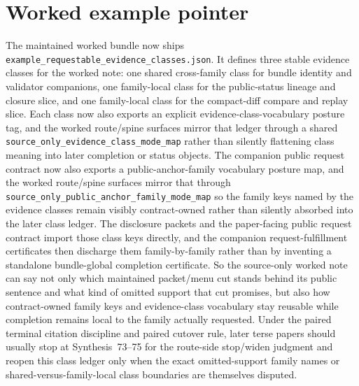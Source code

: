 \documentclass[11pt]{article}
\begin{document}
\section{Worked example pointer}
The maintained worked bundle now ships \nolinkurl{example_requestable_evidence_classes.json}.\cite{series:workedexample}
It defines three stable evidence classes for the worked note: one shared cross-family class for bundle identity and validator companions, one family-local class for the public-status lineage and closure slice, and one family-local class for the compact-diff compare and replay slice. Each class now also exports an explicit evidence-class-vocabulary posture tag, and the worked route/spine surfaces mirror that ledger through a shared \nolinkurl{source_only_evidence_class_mode_map} rather than silently flattening class meaning into later completion or status objects. The companion public request contract now also exports a public-anchor-family vocabulary posture map, and the worked route/spine surfaces mirror that through \nolinkurl{source_only_public_anchor_family_mode_map} so the family keys named by the evidence classes remain visibly contract-owned rather than silently absorbed into the later class ledger.
The disclosure packets and the paper-facing public request contract import those class keys directly, and the companion request-fulfillment certificates then discharge them family-by-family rather than by inventing a standalone bundle-global completion certificate.\cite{series:requestfulfillmentcertificates}
So the source-only worked note can say not only which maintained packet/menu cut stands behind its public sentence and what kind of omitted support that cut promises, but also how contract-owned family keys and evidence-class vocabulary stay reusable while completion remains local to the family actually requested. Under the paired terminal citation discipline and paired cutover rule, later terse papers should usually stop at Synthesis~73--75 for the route-side stop/widen judgment and reopen this class ledger only when the exact omitted-support family names or shared-versus-family-local class boundaries are themselves disputed.\cite{series:requestsideterminalcitationnormalform,series:pairedterminalcitationdiscipline,series:pairedterminalcutoverrules}
\end{document}
